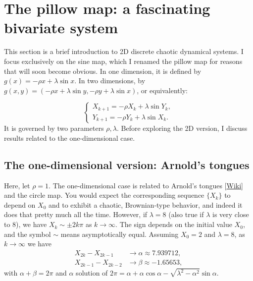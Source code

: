 \documentclass[oneside,10pt]{book}
\begin{document}
\section{The pillow map: a fascinating bivariate system} 

This section is a brief introduction to 2D discrete chaotic dynamical systems. I focus exclusively on the 
\textcolor{index}{sine map}, which I renamed the pillow map for reasons that will soon become obvious.
 In one dimension, it is defined by $g(x)=-\rho x + \lambda \sin x$. In two dimensions, by 
 $g(x,y)=(-\rho x + \lambda \sin y, -\rho y + \lambda \sin x)$, or equivalently:

\begin{equation}
    \begin{cases} 
      X_{k+1} = -\rho X_k + \lambda \sin Y_k, \\[3pt]
     Y_{k+1} = -\rho Y_k + \lambda \sin X_k. \label{gfda}
    \end{cases} %
\end{equation}
It is governed by two parameters $\rho,\lambda$. Before exploring the 2D version, I discuss results related to the one-dimensional case.

\subsection{The one-dimensional version: Arnold's tongues}

Here, let $\rho=1$. The one-dimensional case is related to 
\textcolor{index}{Arnold's tongues} [\href{https://en.wikipedia.org/wiki/Arnold_tongue}{Wiki}] and the \textcolor{index}{circle map}.
You would expect the corresponding sequence $\{X_k\}$ to depend on $X_0$
 and to exhibit a chaotic, Brownian-type behavior, and indeed it does that pretty much all the time.
However, if $\lambda=8$ (also true if $\lambda$  is very close to 8), we have $X_k \sim \pm 2k\pi$ as $k\rightarrow\infty$.
The sign depends on the initial value $X_0$, and the symbol $\sim$ means asymptotically equal.
Assuming $X_0=2$ and $\lambda=8$, as $k\rightarrow\infty$ we have 
\begin{align}
X_{2k}-X_{2k-1} & \rightarrow \alpha\approx 7.939712, \nonumber \\
X_{2k-1}-X_{2k-2} & \rightarrow \beta\approx -1.65653, \nonumber 
\end{align}
with $\alpha + \beta =2\pi$ and $\alpha$ solution of
$2\pi = \alpha + \alpha\cos\alpha -\sqrt{\lambda^2-\alpha^2}\sin\alpha.$
\end{document}
